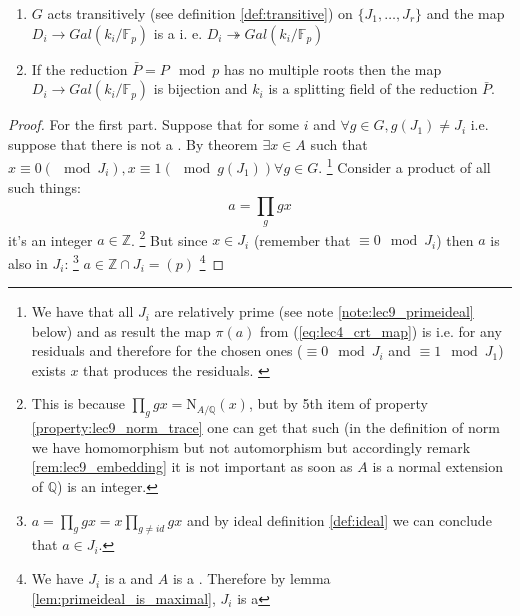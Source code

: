 \begin{theorem}
  \begin{enumerate}
  \item $G$ acts transitively (see definition \ref{def:transitive}) on
    $\{J_1, \dots, J_r\}$ and the map
    $D_i \to Gal\left(k_i/\mathbb{F}_p\right)$ is a
     i. e.
    $D_i \twoheadrightarrow Gal\left(k_i/\mathbb{F}_p\right)$
    \item If the reduction $\bar{P} = P \mod p$ has no multiple roots
      then the map $D_i \to Gal\left(k_i/\mathbb{F}_p\right)$ is
      bijection and $k_i$ is a splitting field of the reduction
      $\bar{P}$. 
  \end{enumerate}
  \label{thm:lec9_2}
  \begin{proof}
    For the first part. Suppose that for some $i$ and $\forall g \in G,
    g\left(J_1\right) \ne J_i$ i.e. suppose that there is not a
    . By  theorem
    $\exists x \in A$ such that
    $x \equiv 0 (\mod J_i),  x \equiv 1 (\mod g\left(J_1\right))
    \forall g \in G$.
    \footnote{
      We have that all $J_i$ are relatively prime (see note
      \ref{note:lec9_primeideal} below) and as result 
      the map $\pi\left(a\right)$ from (\ref{eq:lec4_crt_map}) is
      i.e. for any residuals and therefore for the chosen ones
      ($\equiv 0 \mod J_i$ and $\equiv 1 \mod J_1$) exists $x$ that
      produces the residuals.
      \label{note:lec9_crt}
    }
    Consider a product of all such things:
    \[
    a = \prod_{g} g x
    \]
    it's an integer $a \in \mathbb{Z}$.
    \footnote{
      This is because $\prod_{g} g x =
      \mathrm{N}_{A/\mathbb{Q}}\left(x\right)$, but by 5th item of
      property \ref{property:lec9_norm_trace} one can get that such
      (in the definition of norm we have homomorphism but not
      automorphism but accordingly remark \ref{rem:lec9_embedding} it
      is not important as soon as $A$ is a normal extension of
      $\mathbb{Q}$)  
      is an integer.       
    }
    But since $x \in J_i$
    (remember that $\equiv 0 \mod J_i$)
    then $a$
    is also in $J_i$:
    \footnote{
      $a = \prod_{g} g x = x \prod_{g \ne id} g x$ and by ideal
      definition \ref{def:ideal} we can conclude that $a \in J_i$.
    }
    $a \in \mathbb{Z} \cap J_i = (p)$
    \footnote{
      We have $J_i$ is a  and $A$ is a
      . Therefore by lemma \ref{lem:primeideal_is_maximal},
      $J_i$ is a 
}
\end{proof}
\end{theorem}

